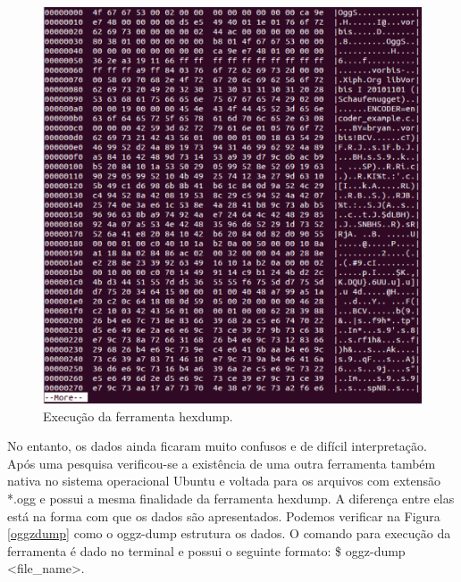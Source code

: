  \begin{figure}[ht]
	\centering
		\includegraphics[keepaspectratio=true,scale=0.5]{figuras/hexdump.eps}
	\caption{Execução da ferramenta hexdump.}
	\label{hexdump}
\end{figure}

No entanto, os dados ainda ficaram muito confusos e de difícil interpretação. Após uma pesquisa verificou-se a existência de uma outra ferramenta também nativa no sistema operacional Ubuntu e voltada para os arquivos com extensão *.ogg e possui a mesma finalidade da ferramenta hexdump. A diferença entre elas está na forma com que os dados são apresentados. Podemos verificar na Figura \ref{oggzdump} como o oggz-dump estrutura os dados. O comando para execução da ferramenta é dado no terminal e possui o seguinte formato: \$ oggz-dump <file\_name>.

